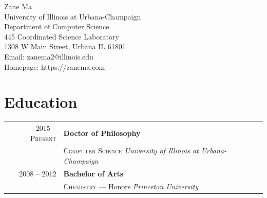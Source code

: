\documentclass[10pt,singlecolumn]{article} %
\begin{document}
\color{text1} %


{\Huge Zane Ma} \vspace{0.5cm}\\ %
University of Illinois at Urbana-Champaign \\
Department of Computer Science \\
445 Coordinated Science Laboratory \\
1308 W Main Street, Urbana IL 61801 \\
Email: zanema2@illinois.edu \\ 
Homepage: https://zanema.com \\ 


\section{Education} 

\begin{tabular}{rl} %


2015 -- \textsc{Present} & \textbf{Doctor of Philosophy} \\ 
& \textsc{Computer Science}  \textit{University of Illinois at Urbana-Champaign}\\ 
	 

2008 -- 2012 & \textbf{Bachelor of Arts} \\ 
& \textsc{Chemistry} --- \small{Honors} \textit{Princeton University}\\
	  
\end{tabular} \\
\end{document}
